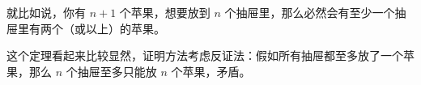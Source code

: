 
就比如说，你有 $n+1$ 个苹果，想要放到 $n$ 个抽屉里，那么必然会有至少一个抽屉里有两个（或以上）的苹果。

这个定理看起来比较显然，证明方法考虑反证法：假如所有抽屉都至多放了一个苹果，那么 $n$ 个抽屉至多只能放 $n$ 个苹果，矛盾。

